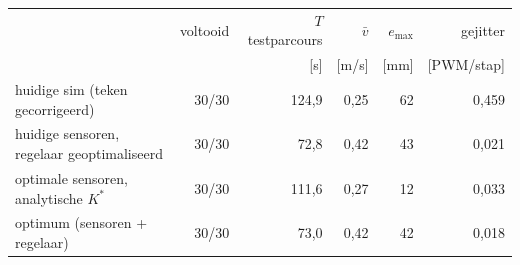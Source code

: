 \begin{tabular}{@{}lrrrrr@{}}
\toprule
 & voltooid & $T$ testparcours & $\bar v$ & $e_{\max}$ & gejitter \\
 & & [s] & [m/s] & [mm] & [PWM/stap] \\
\midrule
huidige sim (teken gecorrigeerd) & 30/30 & 124{,}9 & 0{,}25 & 62 & 0{,}459 \\
huidige sensoren, regelaar geoptimaliseerd & 30/30 & 72{,}8 & 0{,}42 & 43 & 0{,}021 \\
optimale sensoren, analytische $K^*$ & 30/30 & 111{,}6 & 0{,}27 & 12 & 0{,}033 \\
optimum (sensoren + regelaar) & 30/30 & 73{,}0 & 0{,}42 & 42 & 0{,}018 \\
\bottomrule
\end{tabular}

